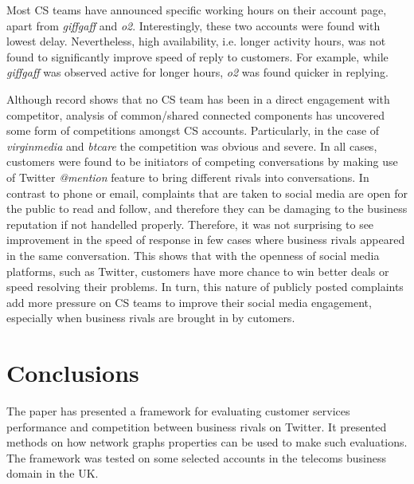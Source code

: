 \documentclass[sigconf]{acmart}
\begin{document}
Most CS teams have announced specific working hours on their account page,
apart from {\emph{giffgaff}} and {\emph{o2}}. Interestingly, these two
accounts were found with lowest delay. Nevertheless, high availability, i.e. longer 
activity hours, was not found to significantly improve speed of reply to
customers. For example, while {\emph{giffgaff}} was observed active for longer
hours, {\emph{o2}} was found quicker in replying.  

Although record shows that no CS team has been in a direct engagement with  
competitor, analysis of common/shared connected components has uncovered 
some form of competitions amongst CS accounts. Particularly, in the case
of {\emph{virginmedia}} and {\emph{btcare}} the competition was
obvious and severe. In all cases, customers were found to be initiators of
competing conversations by making use of Twitter {\emph{@mention}} feature 
to bring different rivals into conversations. In contrast to phone or
email, complaints that are taken to social media are open for the public to read and
follow, and therefore they can be damaging to the business reputation if not handelled
properly. Therefore, it was not surprising to see improvement in the speed of response 
in few cases where business rivals appeared in the same conversation. This shows that with the 
openness of social media platforms, such as Twitter, customers have more chance 
to win better deals or speed resolving their problems. In turn, this nature of publicly 
posted complaints add more pressure on CS teams to improve their social media 
engagement, especially when business rivals are brought in by cutomers.

\section{Conclusions}\label{conclusions}

The paper has presented a framework for evaluating customer services
performance and competition between business rivals on Twitter. It presented 
methods on how network graphs properties can be used to make such evaluations.
The framework was tested on some selected accounts in the telecoms
business domain in the UK.
\end{document}
